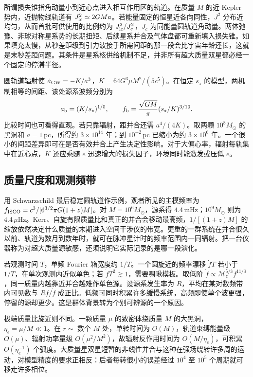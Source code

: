 所谓损失锥指角动量小到近心点进入相互作用区的轨道。在质量 $M$ 的近 Kepler 势内，近抛物线轨道有 $J_{\rm lc}^2\simeq2GM a$。若能量固定的恒星近各向同性，$J^2$ 分布近均匀，从而首批可供使用的比例约为 $J_{\rm lc}^2/J_c^2$，$J_c$ 为同能量圆轨道角动量。两体弛豫、非球对称星系势的长期扭矩、后续星系并合及气体盘都可重新填入损失锥。如果填充太慢，从秒差距级到引力波接手所需间距的那一段会比宇宙年龄还长，这就是末秒差距问题。其条件是星系核供给机制不足，并非所有超大质量双星都必经一个固定的停滞半径。

圆轨道辐射使 $\dot a_{\rm GW}=-K/a^3$，$K=64G^3\mu M^2/(5c^5)$。在恒定 $s_\star$ 的模型，两机制相等的间距、该处源系波频分别为
\[
 a_{\rm b}=(K/s_\star)^{1/5},\qquad
 f_{\rm b}=\frac{\sqrt{GM}}{\pi}(s_\star/K)^{3/10}.
\]
比较时间也可看得直观。若只靠辐射，距并合还需 $a^4/(4K)$。取两颗 $10^8M_\odot$ 的黑洞和 $a=1$\,pc，所得约 $3\times10^{14}$ 年；到 $10^{-2}$\,pc 已缩小为约 $3\times10^6$ 年。一个很小的间距差异即可在是否有效并合上产生决定性影响。对于大偏心率，辐射每轨集中在近心点，$K$ 还应乘随 $e$ 迅速增大的损失因子，环境同时能激发或压低 $e$。

\subsection{质量尺度和观测频带}

用 Schwarzschild 最后稳定圆轨道作示例，观者所见的主模频率为 $f_{\rm ISCO}=c^3/[6^{3/2}\pi G(1+z)M]$。对 $M=10^6M_\odot$，源系得 $4.4$\,mHz；$10^9M_\odot$ 则为 $4.4\,\mu$Hz。Kerr、自旋有限质量比和真正的并合会移动最高频，$1/[(1+z)M]$ 的缩放依然决定什么质量的末期进入空间干涉仪的带宽。更重的一群系统在并合很久以前、轨道为数月到数年时，就可在脉冲星计时的频率范围内一同辐射。把一台仪器称为对超大质量源敏感，还须说明它实际记录的是哪一段演化。

若观测时间 $T$，单频 Fourier 箱宽度约 $1/T$。一个圆旋近的频率漂移 $\dot f T$ 若小于 $1/T$，在单次观测内近似单色；若 $\dot f T^2\gtrsim1$，需要啁啾模板。取低阶 $\dot f\propto\mathcal M_z^{5/3}f^{11/3}$，同一质量内越靠近并合越难作单色源。设源系发生率为 $R$，平均在某对数频带内可见数与 $R f/\dot f$ 成正比。低频可同时积累许多缓慢系统，高频即使单个波更强，停留的源却更少。这是群体背景转为个别可辨源的一个原因。

极端质量比旋近则不同。一颗质量 $\mu$ 的致密体绕质量 $M$ 的大黑洞，$\eta_e=\mu/M\ll1$。在 $r\sim$ 数个 $M$ 处，单转时间为 $O(M)$，轨道束缚能量级 $O(\mu)$、辐射功率量级 $O(\mu^2/M^2)$，故辐射反作用时间为 $O(M/\eta_e)$，可积累 $O(\eta_e^{-1})$ 个弧度。大质量星双星短暂的非线性并合与这种在强场绕转许多周的运动，对模型精度的要求正相反：后者每转很小的误差经过 $10^4$ 至 $10^5$ 个周期就可移走许多相位。

